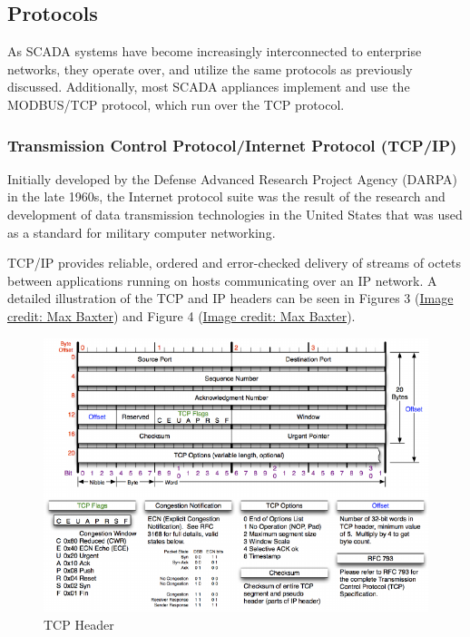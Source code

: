 \documentclass[12pt,]{article}
\begin{document}
\subsection{Protocols}\label{protocols}

As SCADA systems have become increasingly interconnected to enterprise
networks, they operate over, and utilize the same protocols as
previously discussed. Additionally, most SCADA appliances implement and
use the MODBUS/TCP protocol, which run over the TCP protocol.

\subsubsection{Transmission Control Protocol/Internet Protocol
(TCP/IP)}\label{transmission-control-protocolinternet-protocol-tcpip}

Initially developed by the Defense Advanced Research Project Agency
(DARPA) in the late 1960s, the Internet protocol suite was the result of
the research and development of data transmission technologies in the
United States that was used as a standard for military computer
networking.

TCP/IP provides reliable, ordered and error-checked delivery of streams
of octets between applications running on hosts communicating over an IP
network. A detailed illustration of the TCP and IP headers can be seen
in Figures 3
(\href{http://nmap.org/book/images/hdr/MJB-TCP-Header}{Image credit: Max
Baxter}) and Figure 4
(\href{http://nmap.org/book/images/hdr/MJB-IP-Header}{Image credit: Max
Baxter}).

\begin{figure}

{\centering \includegraphics{thesis_files/figure-latex/unnamed-chunk-6-1} 

}

\caption{TCP Header}\label{fig:unnamed-chunk-6}
\end{figure}
\end{document}
